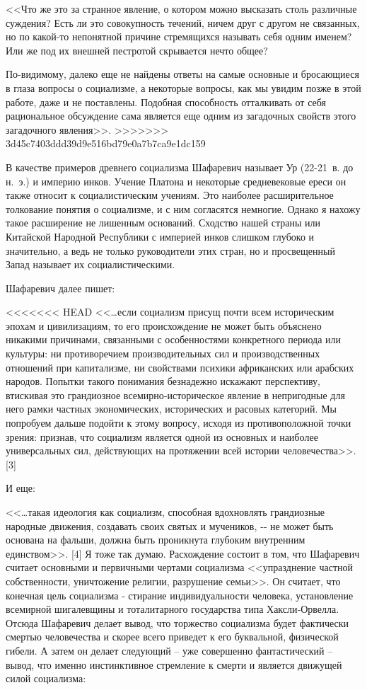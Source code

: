 \documentclass{book}
\begin{document}
<<Что же это за странное явление, о котором можно высказать столь различные суждения? Есть ли это совокупность течений, ничем друг с другом не связанных, но по какой-то непо­нятной причине стремящихся называть себя одним именем? Или же под их внешней пестротой скрывается нечто общее?

По-видимому, далеко еще не найдены ответы на самые основные и бросающиеся в глаза вопросы о социализме, а некоторые вопросы, как мы увидим позже в этой работе, даже и не поставлены. Подобная способность отталкивать от себя рациональное обсуждение сама является еще одним из загадочных свойств этого загадочного явления>>.
>>>>>>> 3d45c7403ddd39d9e516bd79e0a7b7ca9e1dc159

В качестве примеров древнего социализма Шафаревич называет Ур (22-21~в. до н.~э.) и империю инков. Учение Платона и некоторые средневековые ереси он также относит к социалистическим учениям. Это наиболее расширительное толкование понятия о социализме, и с ним согласятся немногие. Однако я нахожу такое расширение не лишенным оснований. Сходст­во нашей страны или Китайской Народной Республики с импе­рией инков слишком глубоко и значительно, а ведь не только руководители этих стран, но и просвещенный Запад называет их социалистическими.

Шафаревич далее пишет:

<<<<<<< HEAD
<<\ldots если социализм присущ почти всем историческим эпохам и цивилизациям, то его происхождение не может быть объяс­нено никакими причинами, связанными с особенностями кон­кретного периода или культуры: ни противоречием производи­тельных сил и производственных отношений при капитализме, ни свойствами психики африканских или арабских народов. По­пытки такого понимания безнадежно искажают перспективу, втискивая это грандиозное всемирно‑историческое явление в непригодные для него рамки частных экономических, истори­ческих и расовых категорий. Мы попробуем дальше подойти к этому вопросу, исходя из противоположной точки зрения: признав, что социализм является одной из основных и наибо­лее универсальных сил, действующих на протяжении всей исто­рии человечества>>. [3]

И еще:

<<\ldots такая идеология как социализм, способная вдохновлять грандиозные народные движения, создавать своих святых и му­чеников, ‑‑ не может быть основана на фальши, должна быть проникнута глубоким внутренним единством>>. [4]
Я тоже так думаю. Расхождение состоит в том, что Шафаревич считает основными и первичными чертами социализма <<упразднение частной собственности, уничтожение религии, раз­рушение семьи>>. Он считает, что конечная цель социализма ‑ стирание индивидуальности человека, установление всемирной шигалевщины и тоталитарного государства типа Хаксли‑Орвелла. Отсюда Шафаревич делает вывод, что торжество социализ­ма будет фактически смертью человечества и скорее всего при­ведет к его буквальной, физической гибели. А затем он делает следующий -- уже совершенно фантастический -- вывод, что именно инстинктивное стремление к смерти и является движу­щей силой социализма:
\end{document}
